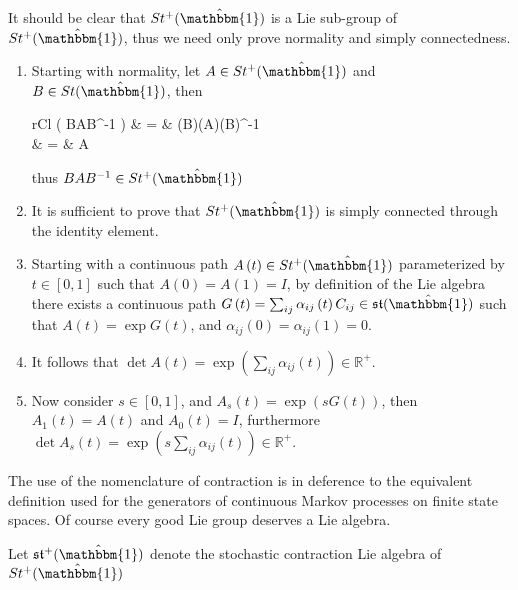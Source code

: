 \begin{IEEEproof}
	It should be clear that $St^{+}(\hat{\mathbbm{1}})$ is a Lie sub-group of $St^{+}(\hat{\mathbbm{1}})$,
	thus we need only prove normality and simply connectedness.
	\begin{enumerate}
		\item Starting with normality, let $A \in St^{+}(\hat{\mathbbm{1}})$ and $B \in St(\hat{\mathbbm{1}})$,
		then
		\begin{IEEEeqnarray*}{rCl}
			\det \left( BAB^{-1} \right)
				& = & \left(\det B\right)\left(\det A\right)\left(\det B\right)^{-1}\\
				& = & \det A
		\end{IEEEeqnarray*}
		thus $BAB^{-1} \in St^{+}(\hat{\mathbbm{1}})$
		\item It is sufficient to prove that $St^{+}(\hat{\mathbbm{1}})$ is simply
		connected through the identity element.
		\item Starting with a continuous path $A\left(t\right) \in St^{+}(\hat{\mathbbm{1}})$
		parameterized by $t \in \left[0,1\right]$ such that $A\left(0\right) = A\left(1\right) = I$,
		by definition of the Lie algebra there exists a continuous path $G\left(t \right) = \sum_{ij} \alpha_{ij}\left(t\right) C_{ij} \in \mathfrak{st}(\hat{\mathbbm{1}})$ 
		such that $A\left(t\right) = \exp G\left(t\right)$, and $\alpha_{ij}\left(0\right) = \alpha_{ij}\left(1\right) = 0$.
		\item It follows that $\det A\left(t\right) = \exp\left(\sum_{ij} \alpha_{ij}\left(t\right)\right) \in \mathbb{R}^{+}$.
		\item Now consider $s \in \left[0,1\right]$, and $A_s\left(t\right) = \exp\left(sG\left(t\right)\right)$,
		then $A_1\left(t\right) = A\left(t\right)$ and $A_0\left(t\right) = I$,
		furthermore $\det A_s\left(t\right) = \exp\left(s \sum_{ij} \alpha_{ij}\left(t\right)\right) \in \mathbb{R}^{+}$.\hfill\IEEEQEDhere
	\end{enumerate}
\end{IEEEproof}

The use of the nomenclature of contraction is in deference to the equivalent
definition used for the generators of continuous Markov processes on finite 
state spaces. Of course every good Lie group deserves a Lie algebra.

\begin{definition}
	Let $\mathfrak{st}^{+}(\hat{\mathbbm{1}})$ denote the stochastic contraction Lie 
	algebra of $St^{+}(\hat{\mathbbm{1}})$
\end{definition}

